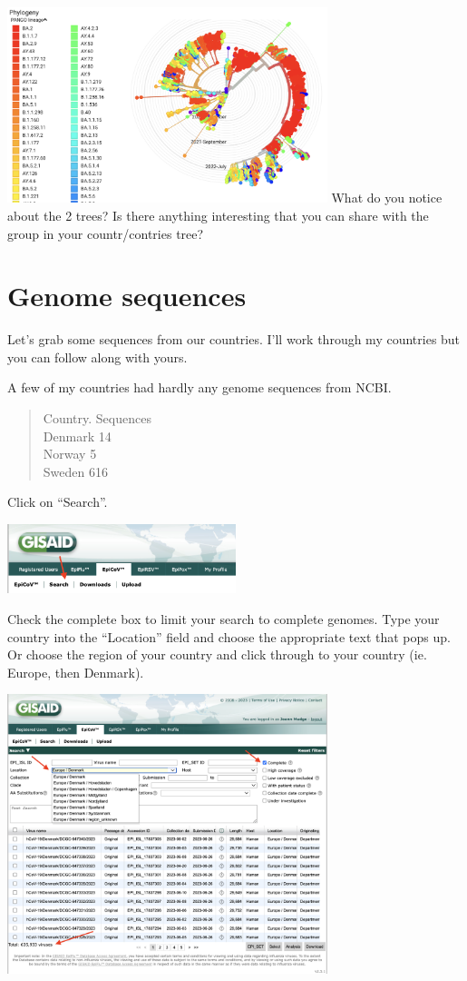 \documentclass[
]{book}
\begin{document}
\includegraphics[width=0.7\textwidth,height=\textheight]{./Figures/DenmarkRadialTimePango.png}
What do you notice about the 2 trees? Is there anything interesting that you can share with the group in your countr/contries tree?

\hypertarget{genome-sequences}{%
\section{Genome sequences}\label{genome-sequences}}

Let's grab some sequences from our countries. I'll work through my countries but you can follow along with yours.

A few of my countries had hardly any genome sequences from NCBI.

\begin{quote}
Country. Sequences\\
Denmark 14\\
Norway 5\\
Sweden 616\\
\end{quote}

Click on ``Search''.

\includegraphics[width=0.5\textwidth,height=\textheight]{./Figures/search.png}

Check the complete box to limit your search to complete genomes. Type your country into the ``Location'' field and choose the appropriate text that pops up. Or choose the region of your country and click through to your country (ie. Europe, then Denmark).

\includegraphics[width=0.7\textwidth,height=\textheight]{./Figures/DenmarkSearch.png}
\end{document}
